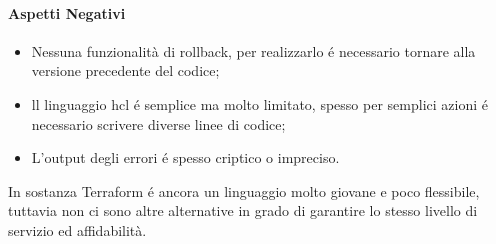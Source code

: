 \documentclass[12pt, a4paper, titlepage]{article}
\begin{document}
\paragraph{Aspetti Negativi}
\begin{itemize}
	\item Nessuna funzionalità di rollback, per realizzarlo é necessario tornare alla versione precedente del codice;
	\item ll linguaggio \gls{hcl} é semplice ma molto limitato, spesso per semplici azioni é necessario scrivere diverse linee di codice;
	\item L'output degli errori é spesso criptico o impreciso.
\end{itemize}

In sostanza Terraform é ancora un linguaggio molto giovane e poco flessibile, tuttavia non ci sono altre alternative in grado di garantire lo stesso livello di servizio ed affidabilità.

\nocite{*}
\newpage
{}
\printglossaries
\newpage
 

\end{document}
